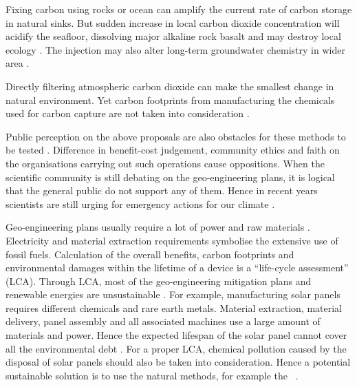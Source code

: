 \documentclass[../thesis.tex]{subfiles} %
\begin{document}
Fixing carbon using rocks \autocite{stephens2008assessing,gunnarsson2018rapid} or ocean \autocite{salter200920,sant2014offshore} can amplify the current rate of carbon storage in natural sinks.  But sudden increase in local carbon dioxide concentration will acidify the seafloor, dissolving major alkaline rock basalt and may destroy local ecology \autocite{trias2017high,ridgwell2011geographical}.  The injection may also alter long-term groundwater chemistry in wider area \autocite{trias2017high}.

Directly filtering atmospheric carbon dioxide \autocite{broecker2007co2,williamson2016emissions} can make the smallest change in natural environment.  Yet carbon footprints from manufacturing the chemicals used for carbon capture are not taken into consideration \autocite{stephens2008assessing}.

Public perception on the above proposals are also obstacles for these methods to be tested \autocite{kamishiro2009public}.  Difference in benefit-cost judgement, community ethics and faith on the organisations carrying out such operations cause oppositions.  When the scientific community is still debating on the geo-engineering plans, it is logical that the general public do not support any of them.  Hence in recent years scientists are still urging for emergency actions for our climate \autocite{lenton2019foresight,van2017open}.

Geo-engineering plans usually require a lot of power and raw materials \autocite{boyd2008ranking,boyd2008implications,mcclellan2012cost}.  Electricity and material extraction requirements symbolise the extensive use of fossil fuels.  Calculation of the overall benefits, carbon footprints and environmental damages within the lifetime of a device is a ``life-cycle assessment” (LCA).  Through LCA, most of the geo-engineering mitigation plans and renewable energies are unsustainable \autocite{abdussalam2020green}.  For example, manufacturing solar panels requires different chemicals and rare earth metals.  Material extraction, material delivery, panel assembly and all associated machines use a large amount of materials and power.  Hence the expected lifespan of the solar panel cannot cover all the environmental debt \autocite{martinopoulos2020rooftop}.  For a proper LCA, chemical pollution caused by the disposal of solar panels should also be taken into consideration.  Hence a potential sustainable solution is to use the natural methods, for example the \phy\ \autocite{farrelly2013carbon}.
\end{document}
